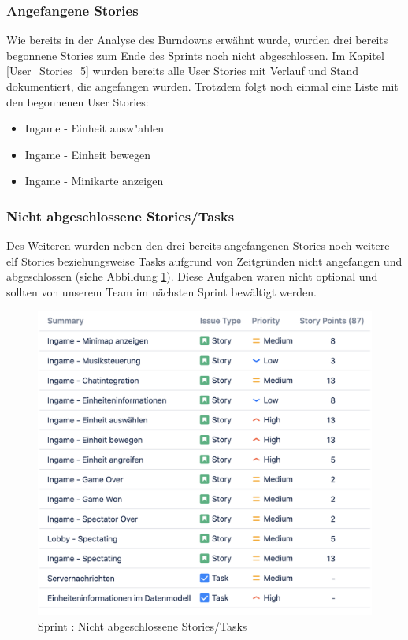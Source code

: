 \documentclass[12pt, titlepage]{scrartcl}
\newcommand{\RN}[1]{%
	\textup{\uppercase\expandafter{\romannumeral#1}}%
}
\begin{document}
        	\subsubsection{Angefangene Stories}
        		Wie bereits in der Analyse des Burndowns erw\"ahnt wurde, wurden drei bereits begonnene Stories zum Ende des Sprints noch nicht abgeschlossen. Im Kapitel \ref{User_Stories_5} wurden bereits alle User Stories mit Verlauf und Stand dokumentiert, die angefangen wurden. Trotzdem folgt noch einmal eine Liste mit den begonnenen User Stories:
        		\begin{itemize}
        			\item Ingame - Einheit ausw"ahlen
        			\item Ingame - Einheit bewegen
        			\item Ingame - Minikarte anzeigen
        		\end{itemize}
        	\subsubsection{Nicht abgeschlossene Stories/Tasks}
        		Des Weiteren wurden neben den drei bereits angefangenen Stories noch weitere elf Stories beziehungsweise Tasks aufgrund von Zeitgr\"unden nicht angefangen und abgeschlossen (siehe Abbildung \ref{To_Do_5}). Diese Aufgaben waren nicht optional und sollten von unserem Team im n\"achsten Sprint bew\"altigt werden.
        		\begin{figure}[H] 
        			\centering
        			\includegraphics[width=\textwidth]{images/sprintV/openIssues.png}
        			\caption{Sprint \RN{5}: Nicht abgeschlossene Stories/Tasks}
        			\label{To_Do_5}
        		\end{figure}
\end{document}
